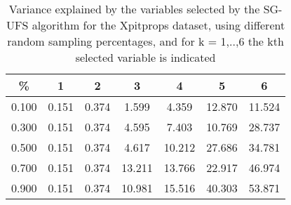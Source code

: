 \begin{table}
	\begin{center}
		\begin{tabular}{c c c c c c c}
			\% & 1 & 2 & 3 & 4 & 5 & 6 \\
			\hline
			0.100 & 0.151 & 0.374 & 1.599 & 4.359 & 12.870 & 11.524 \\
			0.300 & 0.151 & 0.374 & 4.595 & 7.403 & 10.769 & 28.737 \\
			0.500 & 0.151 & 0.374 & 4.617 & 10.212 & 27.686 & 34.781 \\
			0.700 & 0.151 & 0.374 & 13.211 & 13.766 & 22.917 & 46.974 \\
			0.900 & 0.151 & 0.374 & 10.981 & 15.516 & 40.303 & 53.871 \\
		\end{tabular}
	\end{center}
	\caption{Variance explained by the variables selected by the SG-UFS algorithm for the Xpitprops dataset, using different random sampling percentages, and for k = 1,..,6 the kth selected variable is indicated}
\end{table}